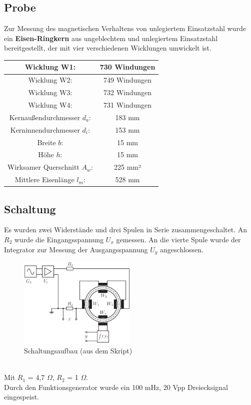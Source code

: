 \documentclass[a4paper,twoside,12pt,DIV=13,BCOR=5mm,numbers=noenddot,cleardoublepage=empty]{scrbook}
\begin{document}
    \newpage
    
    \subsection{Probe}

    Zur Messung des magnetischen Verhaltens von unlegiertem Einsatzstahl wurde ein \textbf{Eisen-Ringkern} aus ungeblechtem und unlegiertem Einsatzstahl bereitgestellt, der mit vier verschiedenen Wicklungen umwickelt ist.

    \begin{center}
    \begin{tabular}{|c|c|} \hline
    Wicklung W1: & 730 Windungen \\ \hline
    Wicklung W2: & 749 Windungen \\ \hline
    Wicklung W3: & 732 Windungen \\ \hline
    Wicklung W4: & 731 Windungen \\ \hline
    Kernaußendurchmesser $d_a$: & 183 mm \\ \hline
    Kerninnendurchmesser $d_i$: & 153 mm \\ \hline
    Breite $b$: & 15 mm \\ \hline
    Höhe $h$: & 15 mm \\ \hline
    Wirksamer Querschnitt $A_w$: & 225 mm² \\ \hline
    Mittlere Eisenlänge $l_m$: & 528 mm \\ \hline
    \end{tabular}
    \end{center}
    
    \subsection{Schaltung}

    Es wurden zwei Widerstände und drei Spulen in Serie zusammengeschaltet. An \textit{$R_2$} wurde die Eingangsspannung $U_x$ gemessen. An die vierte Spule wurde der Integrator zur Messung der Ausgangsspannung $U_y$ angeschlossen.
    \begin{figure}[h] 
    \centering
    \includegraphics[width=0.5\textwidth]{pictures/HystereseSchaltung.png} %
    \caption{Schaltungsaufbau (aus dem Skript)}
    \end{figure}
    \\
    Mit $R_1$ = 4,7 $\Omega$, $R_2$ = 1 $\Omega$. \\
    Durch den Funktionsgenerator wurde ein 100 mHz, 20 Vpp Dreiecksignal eingespeist.
\end{document}
